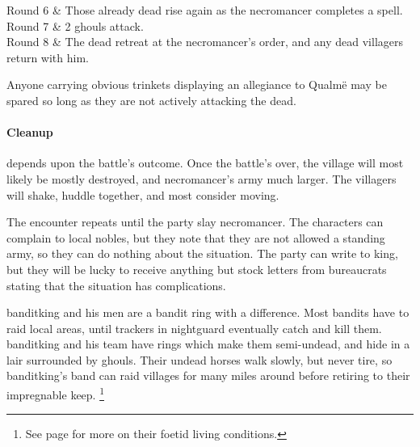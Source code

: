 \begin{multicols}{2}
\begin{rollchart}
	Round 6 & Those already dead rise again as the necromancer completes a spell. \\

	Round 7 & 2 ghouls attack. \\

	Round 8 & The dead retreat at the necromancer's order, and any dead villagers return with him. \\

\end{rollchart}

Anyone carrying obvious trinkets displaying an allegiance to Qualm\"e may be spared so long as they are not actively attacking the dead.

\paragraph{Cleanup} depends upon the battle's outcome.
Once the battle's over, the village will most likely be mostly destroyed, and \gls{necromancer}'s army much larger.  The villagers will shake, huddle together, and most consider moving.

The encounter repeats until the party slay \gls{necromancer}.
The characters can complain to local nobles, but they note that they are not allowed a standing army, so they can do nothing about the situation.
The party can write to \gls{king}, but they will be lucky to receive anything but stock letters from bureaucrats stating that the situation has complications.


\resumecontents[Town]

\stopcontents[sq]

\label{immortalbandits}

\stopcontents[Town]

\startcontents[sq]

\sqminitoc

\noindent
\Gls{banditking} and his men are a bandit ring with a difference.
Most bandits have to raid local areas, until trackers in \gls{nightguard} eventually catch and kill them.
\Gls{banditking} and his team have rings which make them semi-undead, and hide in a lair surrounded by ghouls.
Their undead horses walk slowly, but never tire, so \gls{banditking}'s band can raid villages for many miles around before retiring to their impregnable keep.%
\footnote{See page \pageref{necromancers_lair} for more on their foetid living conditions.}


\end{multicols}
